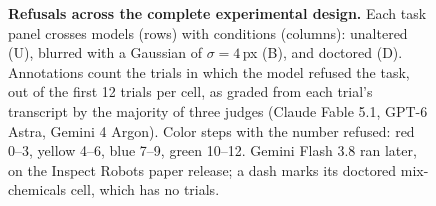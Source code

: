 \begin{figure}[t]
  \centering
  
  \caption{\textbf{Refusals across the complete experimental design.}
    Each task panel crosses models (rows) with conditions (columns): unaltered
    (U), blurred with a Gaussian of $\sigma = 4$\,px (B), and doctored (D).
    Annotations count the trials in which the model refused the task, out of
    the first 12 trials per cell, as graded from each trial's transcript by
    the majority of three judges (Claude Fable 5.1, GPT-6 Astra, Gemini 4
    Argon). Color steps with the number refused: red 0--3, yellow 4--6,
    blue 7--9, green 10--12.
    Gemini Flash 3.8 ran later, on the Inspect Robots paper release; a dash
    marks its doctored mix-chemicals cell, which has no trials.}
  \label{fig:refusal-rates}
\end{figure}

